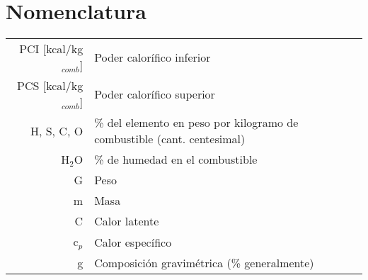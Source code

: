 \documentclass[11pt,a4paper]{article}
\begin{document}
	\pagestyle{pieyencabezado}
	
	\section*{Nomenclatura}
	\begin{tabular}{r l}
		PCI [kcal/kg$_{comb}$] & Poder calorífico inferior \\
		PCS [kcal/kg$_{comb}$] & Poder calorífico superior \\
		H, S, C, O & \% del elemento en peso por kilogramo de combustible (cant. centesimal)\\
		H$_2$O & \% de humedad en el combustible \\
		G & Peso\\
		m & Masa\\
		C & Calor latente\\
		c$_p$ & Calor específico\\
		g & Composición gravimétrica (\% generalmente)
	\end{tabular}

	
\end{document}
